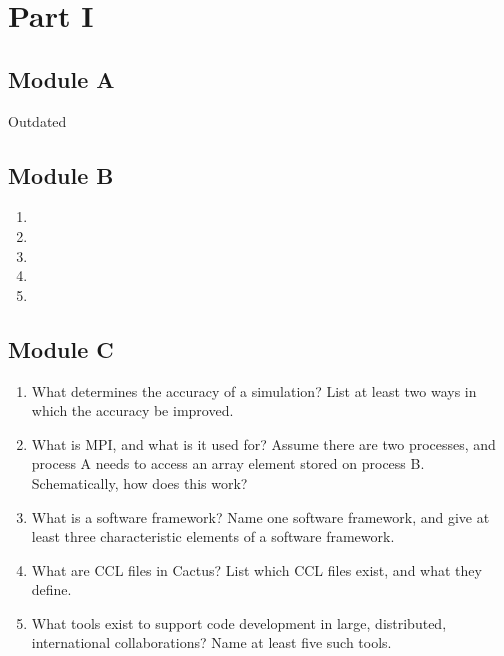 \documentclass[10pt]{article}
\begin{document}
\section{Part I}
\subsection{Module A}
 Outdated
\subsection{Module B}
 \begin{enumerate}
  \item
  \item
  \item
  \item
  \item
 \end{enumerate}
\subsection{Module C}
 \begin{enumerate}
 \item What determines the accuracy of a simulation? List at least two
   ways in which the accuracy be improved.
 \item What is MPI, and what is it used for? Assume there are two
   processes, and process A needs to access an array element stored on
   process B\@. Schematically, how does this work?
 \item What is a software framework? Name one software framework, and
   give at least three characteristic elements of a software
   framework.
 \item What are CCL files in Cactus? List which CCL files exist, and
   what they define.
 \item What tools exist to support code development in large,
   distributed, international collaborations? Name at least five such
   tools.
 \end{enumerate}
\end{document}
